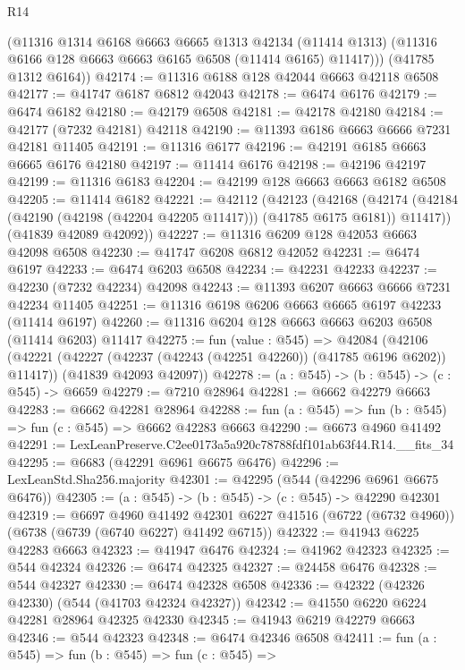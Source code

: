 \begin{lexlean}{R14}
\begin{coremodule}
        (@11316
          @1314
          @6168
          @6663
          @6665
          @1313
          @42134
          (@11414 @1313)
          (@11316 @6166 @128 @6663 @6663 @6165 @6508 (@11414 @6165) @11417)))
      (@41785 @1312 @6164))
@42174 := @11316 @6188 @128 @42044 @6663 @42118 @6508
@42177 := @41747 @6187 @6812 @42043
@42178 := @6474 @6176
@42179 := @6474 @6182
@42180 := @42179 @6508
@42181 := @42178 @42180
@42184 := @42177 (@7232 @42181) @42118
@42190 := @11393 @6186 @6663 @6666 @7231 @42181 @11405
@42191 := @11316 @6177
@42196 := @42191 @6185 @6663 @6665 @6176 @42180
@42197 := @11414 @6176
@42198 := @42196 @42197
@42199 := @11316 @6183
@42204 := @42199 @128 @6663 @6663 @6182 @6508
@42205 := @11414 @6182
@42221 := @42112
    (@42123
      (@42168
        (@42174 (@42184 (@42190 (@42198 (@42204 @42205 @11417))) (@41785 @6175 @6181)) @11417))
      (@41839 @42089 @42092))
@42227 := @11316 @6209 @128 @42053 @6663 @42098 @6508
@42230 := @41747 @6208 @6812 @42052
@42231 := @6474 @6197
@42233 := @6474 @6203 @6508
@42234 := @42231 @42233
@42237 := @42230 (@7232 @42234) @42098
@42243 := @11393 @6207 @6663 @6666 @7231 @42234 @11405
@42251 := @11316 @6198 @6206 @6663 @6665 @6197 @42233 (@11414 @6197)
@42260 := @11316 @6204 @128 @6663 @6663 @6203 @6508 (@11414 @6203) @11417
@42275 := fun (value : @545) =>
  @42084
    (@42106
      (@42221 (@42227 (@42237 (@42243 (@42251 @42260)) (@41785 @6196 @6202)) @11417))
      (@41839 @42093 @42097))
@42278 := (a : @545) -> (b : @545) -> (c : @545) -> @6659
@42279 := @7210 @28964
@42281 := @6662 @42279 @6663
@42283 := @6662 @42281 @28964
@42288 := fun (a : @545) => fun (b : @545) => fun (c : @545) => @6662 @42283 @6663
@42290 := @6673 @4960 @41492
@42291 := LexLeanPreserve.C2ee0173a5a920c78788fdf101ab63f44.R14.__fits_34
@42295 := @6683 (@42291 @6961 @6675 @6476)
@42296 := LexLeanStd.Sha256.majority
@42301 := @42295 (@544 (@42296 @6961 @6675 @6476))
@42305 := (a : @545) -> (b : @545) -> (c : @545) -> @42290 @42301
@42319 := @6697
    @4960
    @41492
    @42301
    @6227
    @41516
    (@6722 (@6732 @4960))
    (@6738 (@6739 (@6740 @6227) @41492 @6715))
@42322 := @41943 @6225 @42283 @6663
@42323 := @41947 @6476
@42324 := @41962 @42323
@42325 := @544 @42324
@42326 := @6474 @42325
@42327 := @24458 @6476
@42328 := @544 @42327
@42330 := @6474 @42328 @6508
@42336 := @42322 (@42326 @42330) (@544 (@41703 @42324 @42327))
@42342 := @41550 @6220 @6224 @42281 @28964 @42325 @42330
@42345 := @41943 @6219 @42279 @6663
@42346 := @544 @42323
@42348 := @6474 @42346 @6508
@42411 := fun (a : @545) =>
  fun (b : @545) =>
  fun (c : @545) =>

\end{coremodule}
\end{lexlean}
